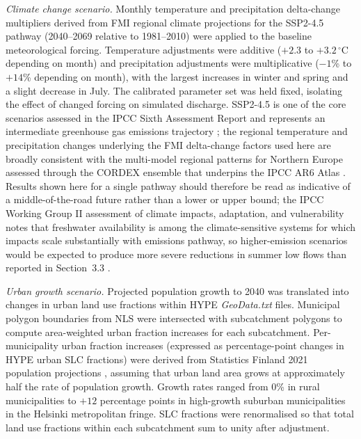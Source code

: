 \documentclass[draft]{agujournal2019}
\begin{document}
\textit{Climate change scenario.} Monthly temperature and precipitation delta-change multipliers derived from FMI regional climate projections for the SSP2-4.5 pathway (2040–2069 relative to 1981–2010) were applied to the baseline meteorological forcing. Temperature adjustments were additive ($+2.3$ to $+3.2\,^\circ$C depending on month) and precipitation adjustments were multiplicative ($-1$\% to $+14$\% depending on month), with the largest increases in winter and spring and a slight decrease in July. The calibrated parameter set was held fixed, isolating the effect of changed forcing on simulated discharge. SSP2-4.5 is one of the core scenarios assessed in the IPCC Sixth Assessment Report and represents an intermediate greenhouse gas emissions trajectory \cite{IPCC_AR6_SYR2023}; the regional temperature and precipitation changes underlying the FMI delta-change factors used here are broadly consistent with the multi-model regional patterns for Northern Europe assessed through the CORDEX ensemble that underpins the IPCC AR6 Atlas \cite{DiezSierra2022}. Results shown here for a single pathway should therefore be read as indicative of a middle-of-the-road future rather than a lower or upper bound; the IPCC Working Group II assessment of climate impacts, adaptation, and vulnerability notes that freshwater availability is among the climate-sensitive systems for which impacts scale substantially with emissions pathway, so higher-emission scenarios would be expected to produce more severe reductions in summer low flows than reported in Section~3.3 \cite{IPCC_AR6_WGII_SPM2022}.

\textit{Urban growth scenario.} Projected population growth to 2040 was translated into changes in urban land use fractions within HYPE \textit{GeoData.txt} files. Municipal polygon boundaries from NLS were intersected with subcatchment polygons to compute area-weighted urban fraction increases for each subcatchment. Per-municipality urban fraction increases (expressed as percentage-point changes in HYPE urban SLC fractions) were derived from Statistics Finland 2021 population projections \cite{StatFin2021}, assuming that urban land area grows at approximately half the rate of population growth. Growth rates ranged from 0\% in rural municipalities to $+12$ percentage points in high-growth suburban municipalities in the Helsinki metropolitan fringe. SLC fractions were renormalised so that total land use fractions within each subcatchment sum to unity after adjustment.
\end{document}
